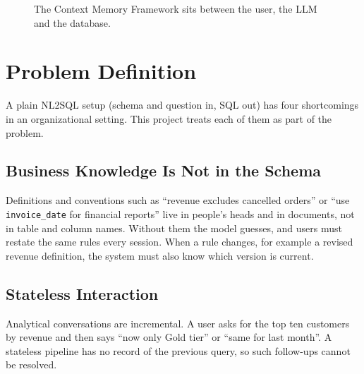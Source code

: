 \begin{figure}[H]
    \centering
    \caption{The Context Memory Framework sits between the user, the LLM and the database.}
    \label{fig:intro_overview}
\end{figure}

\section{Problem Definition}
A plain NL2SQL setup (schema and question in, SQL out) has four shortcomings in an
organizational setting. This project treats each of them as part of the problem.

\subsection{Business Knowledge Is Not in the Schema}
Definitions and conventions such as ``revenue excludes cancelled orders'' or ``use
\texttt{invoice\_date} for financial reports'' live in people's heads and in documents, not
in table and column names. Without them the model guesses, and users must restate the same
rules every session. When a rule changes, for example a revised revenue definition, the
system must also know which version is current.

\subsection{Stateless Interaction}
Analytical conversations are incremental. A user asks for the top ten customers by revenue
and then says ``now only Gold tier'' or ``same for last month''. A stateless pipeline has no
record of the previous query, so such follow-ups cannot be resolved.

